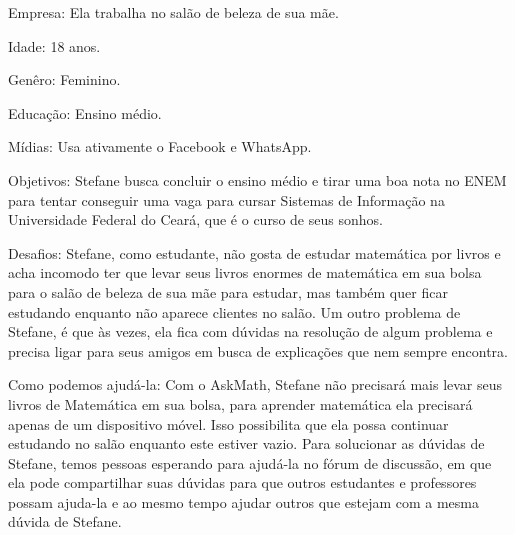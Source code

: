 Empresa: Ela trabalha no salão de beleza de sua mãe.

Idade: 18 anos.

Genêro: Feminino.

Educação: Ensino médio.

Mídias: Usa ativamente o Facebook e WhatsApp.

Objetivos: Stefane busca concluir o ensino médio e tirar uma boa nota no ENEM 
para tentar conseguir uma vaga para cursar Sistemas de Informação na Universidade Federal do Cear\'a, que é 
o curso de seus sonhos.

Desafios: Stefane, como estudante, não gosta de estudar matemática por livros e acha incomodo ter que levar seus livros enormes de matemática em sua bolsa para o salão de beleza de sua mãe para 
estudar, mas tamb\'em quer ficar estudando enquanto não aparece clientes no salão. Um outro problema de Stefane, é que às vezes, ela fica com dúvidas na resolução de algum problema e precisa ligar 
para seus amigos em busca de explicações que nem sempre encontra.

Como podemos ajudá-la: Com o AskMath, Stefane não precisará mais levar seus livros de Matemática em sua bolsa, para aprender matemática ela precisar\'a apenas de um dispositivo móvel. Isso possibilita que ela possa continuar estudando no salão enquanto este estiver vazio. Para solucionar as dúvidas de Stefane, temos pessoas esperando para ajudá-la no f\'orum de discuss\~ao, em que ela pode compartilhar suas d\'uvidas para que outros estudantes e professores possam ajuda-la e ao mesmo tempo ajudar outros 
que estejam com a mesma d\'uvida de Stefane. 

